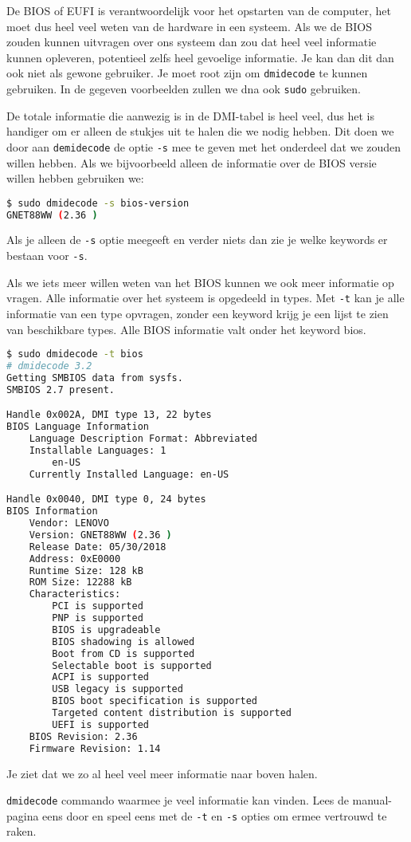 De BIOS of EUFI is verantwoordelijk voor het opstarten van de computer, het moet dus heel veel weten van de hardware in een systeem. Als we de BIOS zouden kunnen uitvragen over ons systeem dan zou dat heel veel informatie kunnen opleveren, potentieel zelfs heel gevoelige informatie. Je kan dan dit dan ook niet als gewone gebruiker. Je moet root zijn om \texttt{dmidecode} te kunnen gebruiken. In de gegeven voorbeelden zullen we dna ook \texttt{sudo} gebruiken.

De totale informatie die aanwezig is in de DMI-tabel is heel veel, dus het is handiger om er alleen de stukjes uit te halen die we nodig hebben. Dit doen we door aan \texttt{demidecode} de optie \texttt{-s} mee te geven met het onderdeel dat we zouden willen hebben. Als we bijvoorbeeld alleen de informatie over de BIOS versie willen hebben gebruiken we:
\begin{lstlisting}[language=bash]
$ sudo dmidecode -s bios-version
GNET88WW (2.36 )
\end{lstlisting}
Als je alleen de \texttt{-s} optie meegeeft en verder niets dan zie je welke keywords er bestaan voor \texttt{-s}.

Als we iets meer willen weten van het BIOS kunnen we ook meer informatie op vragen. Alle informatie over het systeem is opgedeeld in types. Met \texttt{-t} kan je alle informatie van een type opvragen, zonder een keyword krijg je een lijst te zien van beschikbare types. Alle BIOS informatie valt onder het keyword bios.
\begin{lstlisting}[language=bash]
$ sudo dmidecode -t bios
# dmidecode 3.2
Getting SMBIOS data from sysfs.
SMBIOS 2.7 present.

Handle 0x002A, DMI type 13, 22 bytes
BIOS Language Information
	Language Description Format: Abbreviated
	Installable Languages: 1
		en-US
	Currently Installed Language: en-US

Handle 0x0040, DMI type 0, 24 bytes
BIOS Information
	Vendor: LENOVO
	Version: GNET88WW (2.36 )
	Release Date: 05/30/2018
	Address: 0xE0000
	Runtime Size: 128 kB
	ROM Size: 12288 kB
	Characteristics:
		PCI is supported
		PNP is supported
		BIOS is upgradeable
		BIOS shadowing is allowed
		Boot from CD is supported
		Selectable boot is supported
		ACPI is supported
		USB legacy is supported
		BIOS boot specification is supported
		Targeted content distribution is supported
		UEFI is supported
	BIOS Revision: 2.36
	Firmware Revision: 1.14
\end{lstlisting}
Je ziet dat we zo al heel veel meer informatie naar boven halen.

\texttt{dmidecode} commando waarmee je veel informatie kan vinden. Lees de manual-pagina eens door en speel eens met de \texttt{-t} en \texttt{-s} opties om ermee vertrouwd te raken.


